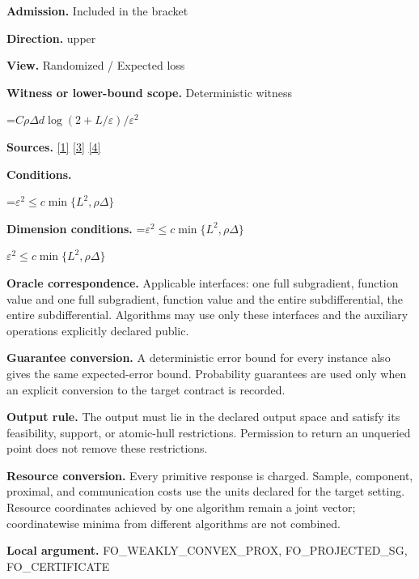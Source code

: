 \documentclass[10pt,a4paper]{article}
\newcommand{\AtlasMath}[1]{\par\begingroup\centering\setbox0=\hbox{$\displaystyle #1$}\ifdim\wd0>1.4\linewidth\typeout{ATLAS WIDE FORMULA: \the\wd0}\fi\ifdim\wd0>\linewidth\resizebox{\linewidth}{!}{\box0}\else\box0\fi\par\endgroup}
\newcommand{\AtlasInlineMath}[1]{\begingroup\setbox0=\hbox{$#1$}\ifdim\wd0>.4\linewidth\endgroup\AtlasMath{#1}\else\endgroup$#1$\fi}
\begin{document}
\textbf{Admission.} Included in the bracket



\textbf{Direction.} upper



\textbf{View.} Randomized / Expected loss



\textbf{Witness or lower-bound scope.} Deterministic witness



\AtlasMath{C\rho\Delta d\log(2+L/\varepsilon)/\varepsilon^2}


\textbf{Sources.} \href{https://www2.isye.gatech.edu/~nemirovs/MOR_AccuracyCertificates.pdf}{[1]} \href{https://arxiv.org/pdf/1405.4980}{[3]} \href{https://arxiv.org/pdf/2609.20701}{[4]}



\textbf{Conditions.}
\AtlasMath{\varepsilon^2\le c\min\{L^2,\rho\Delta\}}




\textbf{Dimension conditions.} \AtlasInlineMath{\varepsilon^2\le c\min\{L^2,\rho\Delta\}}



\textbf{Oracle correspondence.} Applicable interfaces: one full subgradient, function value and one full subgradient, function value and the entire subdifferential, the entire subdifferential. Algorithms may use only these interfaces and the auxiliary operations explicitly declared public.



\textbf{Guarantee conversion.} A deterministic error bound for every instance also gives the same expected-error bound. Probability guarantees are used only when an explicit conversion to the target contract is recorded.



\textbf{Output rule.} The output must lie in the declared output space and satisfy its feasibility, support, or atomic-hull restrictions. Permission to return an unqueried point does not remove these restrictions.



\textbf{Resource conversion.} Every primitive response is charged. Sample, component, proximal, and communication costs use the units declared for the target setting. Resource coordinates achieved by one algorithm remain a joint vector; coordinatewise minima from different algorithms are not combined.



\textbf{Local argument.} FO\_WEAKLY\_CONVEX\_PROX, FO\_PROJECTED\_SG, FO\_CERTIFICATE
\end{document}
